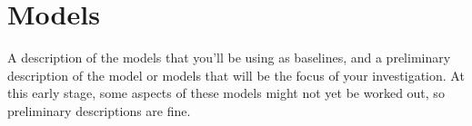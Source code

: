 \section{Models}
\label{sec:models}

A description of the models that you'll be using as baselines, and a preliminary description of the model or models that will be the focus of your investigation. At this early stage, some aspects of these models might not yet be worked out, so preliminary descriptions are fine.